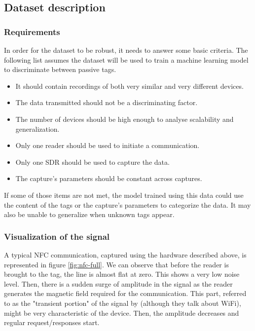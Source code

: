 \subsection{Dataset description}

\subsubsection{Requirements}

In order for the dataset to be robust, it needs to answer some basic criteria. The following list assumes the dataset will be used to train a machine learning model to discriminate between passive tags.

\begin{itemize}
  \item It should contain recordings of both very similar and very different devices.
  \item The data transmitted should not be a discriminating factor.
  \item The number of devices should be high enough to analyse scalability and generalization.
  \item Only one reader should be used to initiate a communication.
  \item Only one SDR should be used to capture the data.
  \item The capture's parameters should be constant across captures.
\end{itemize}

If some of those items are not met, the model trained using this data could use the content of the tags or the capture's parameters to categorize the data. It may also be unable to generalize when unknown tags appear.

\newpage
\subsubsection{Visualization of the signal}

A typical NFC communication, captured using the hardware described above, is represented in figure \ref{fig:nfc-full}. We can observe that before the reader is brought to the tag, the line is almost flat at zero. This shows a very low noise level. Then, there is a sudden surge of amplitude in the signal as the reader generates the magnetic field required for the communication. This part, referred to as the "transient portion" of the signal by \textcite{xu_device_2015} (although they talk about WiFi), might be very characteristic of the device. Then, the amplitude decreases and regular request/responses start.

